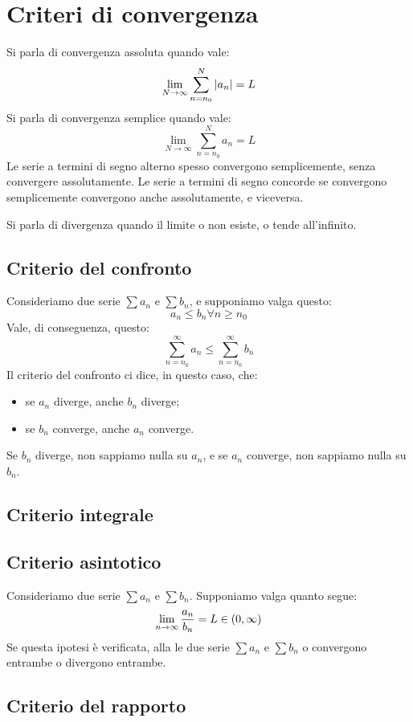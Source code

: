 \section{Criteri di convergenza}

Si parla di convergenza assoluta quando vale:
\[
\lim_{N \to \infty} \sum_{n = n_0}^{N} \left\lvert{a_n}\right\rvert = L
\]
Si parla di convergenza semplice quando vale:
\[
\lim_{N \to \infty} \sum_{n = n_0}^{N} a_n = L
\]
Le serie a termini di segno alterno spesso convergono semplicemente,
senza convergere assolutamente. Le serie a termini di segno concorde
se convergono semplicemente convergono anche assolutamente, e viceversa.

Si parla di divergenza quando il limite o non esiste, o tende all'infinito.

\subsection{Criterio del confronto}

Consideriamo due serie $\sum a_n$ e $\sum b_n$, e supponiamo valga questo:
\[
a_n \le b_n \forall n \ge n_0
\]
Vale, di conseguenza, questo:
\[
\sum_{n = n_0}^{\infty} a_n \le \sum_{n = n_0}^{\infty} b_n
\]
Il criterio del confronto ci dice, in questo caso, che:
\begin{itemize}
    \item se $a_n$ diverge, anche $b_n$ diverge;
    \item se $b_n$ converge, anche $a_n$ converge.
\end{itemize}
Se $b_n$ diverge, non sappiamo nulla su $a_n$, e se $a_n$ converge, non 
sappiamo nulla su $b_n$.

\subsection{Criterio integrale}

\subsection{Criterio asintotico}

Consideriamo due serie $\sum a_n$ e $\sum b_n$. Supponiamo valga quanto
segue:
\[
\lim_{n \to \infty} \frac{a_n}{b_n} = L \in \ooint{0}{\infty}
\]
Se questa ipotesi \`e verificata, alla le due serie $\sum a_n$ e $\sum b_n$ 
o convergono entrambe o divergono entrambe.

\subsection{Criterio del rapporto}


